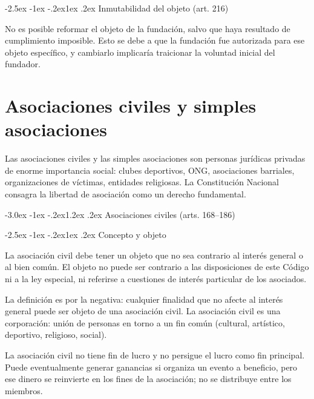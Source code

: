 \documentclass[12pt,oneside]{book}
\makeatletter
\renewcommand\section{\@startsection{section}{1}{\z@}%
  {-3.0ex \@plus -1ex \@minus -.2ex}{1.2ex \@plus .2ex}%
  {\normalfont\large\bfseries\color{acento}}}
\renewcommand\subsection{\@startsection{subsection}{2}{\z@}%
  {-2.5ex \@plus -1ex \@minus -.2ex}{1ex \@plus .2ex}%
  {\normalfont\normalsize\bfseries}}
\makeatother
\begin{document}
\subsection{Inmutabilidad del objeto (art. 216)}

No es posible reformar el objeto de la fundación, salvo que haya resultado de cumplimiento imposible. Esto se debe a que la fundación fue autorizada para ese objeto específico, y cambiarlo implicaría traicionar la voluntad inicial del fundador.


\chapter{Asociaciones civiles y simples asociaciones}

Las asociaciones civiles y las simples asociaciones son personas jurídicas privadas de enorme importancia social: clubes deportivos, ONG, asociaciones barriales, organizaciones de víctimas, entidades religiosas. La Constitución Nacional consagra la libertad de asociación como un derecho fundamental.

\section{Asociaciones civiles (arts. 168--186)}

\subsection{Concepto y objeto}

\begin{definicion}
La asociación civil debe tener un objeto que no sea contrario al interés general o al bien común. El objeto no puede ser contrario a las disposiciones de este Código ni a la ley especial, ni referirse a cuestiones de interés particular de los asociados.
\end{definicion}

La definición es por la negativa: cualquier finalidad que no afecte al interés general puede ser objeto de una asociación civil. La asociación civil es una corporación: unión de personas en torno a un fin común (cultural, artístico, deportivo, religioso, social).

\begin{importante}
La asociación civil no tiene fin de lucro y no persigue el lucro como fin principal. Puede eventualmente generar ganancias si organiza un evento a beneficio, pero ese dinero se reinvierte en los fines de la asociación; no se distribuye entre los miembros.
\end{importante}
\end{document}
